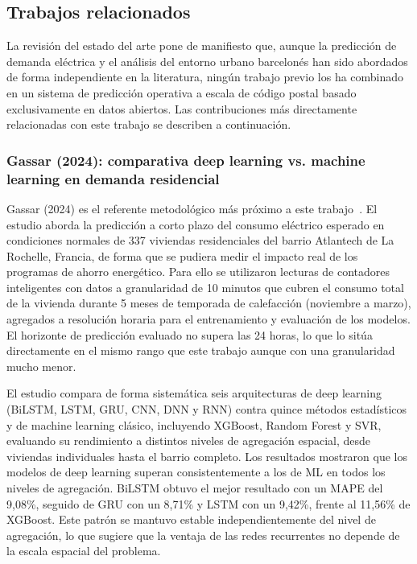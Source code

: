 \documentclass[12pt, a4paper]{article}
\begin{document}
\subsection{Trabajos relacionados}

La revisión del estado del arte pone de manifiesto que, aunque la predicción de demanda eléctrica y el análisis del entorno urbano barcelonés han sido abordados de forma independiente en la literatura, ningún trabajo previo los ha combinado en un sistema de predicción operativa a escala de código postal basado exclusivamente en datos abiertos. Las contribuciones más directamente relacionadas con este trabajo se describen a continuación.

\subsubsection{Gassar (2024): comparativa deep learning vs. machine learning en demanda residencial}

Gassar (2024) es el referente metodológico más próximo a este trabajo~\cite{gassar2024}. El estudio aborda la predicción a corto plazo del consumo eléctrico esperado en condiciones normales de 337 viviendas residenciales del barrio Atlantech de La Rochelle, Francia, de forma que se pudiera medir el impacto real de los programas de ahorro energético. Para ello se utilizaron lecturas de contadores inteligentes con datos a granularidad de 10 minutos que cubren el consumo total de la vivienda durante 5 meses de temporada de calefacción (noviembre a marzo), agregados a resolución horaria para el entrenamiento y evaluación de los modelos. El horizonte de predicción evaluado no supera las 24 horas, lo que lo sitúa directamente en el mismo rango que este trabajo aunque con una granularidad mucho menor.

El estudio compara de forma sistemática seis arquitecturas de deep learning (BiLSTM, LSTM, GRU, CNN, DNN y RNN) contra quince métodos estadísticos y de machine learning clásico, incluyendo XGBoost, Random Forest y SVR, evaluando su rendimiento a distintos niveles de agregación espacial, desde viviendas individuales hasta el barrio completo. Los resultados mostraron que los modelos de deep learning superan consistentemente a los de ML en todos los niveles de agregación. BiLSTM obtuvo el mejor resultado con un MAPE del 9,08\%, seguido de GRU con un 8,71\% y LSTM con un 9,42\%, frente al 11,56\% de XGBoost. Este patrón se mantuvo estable independientemente del nivel de agregación, lo que sugiere que la ventaja de las redes recurrentes no depende de la escala espacial del problema.
\end{document}
